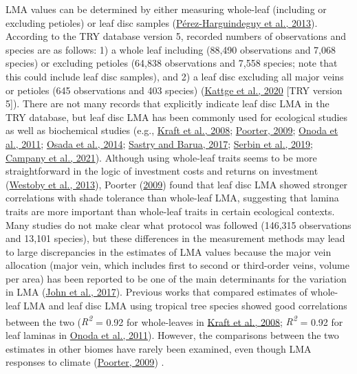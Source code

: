 \documentclass[
  12pt,
  a4paper,
,tablecaptionabove
]{scrartcl}
\begin{document}
LMA values can be determined by either measuring whole-leaf (including or excluding petioles) or leaf disc samples (\protect\hyperlink{ref-Perez-Harguindeguy2013}{Pérez-Harguindeguy et al., 2013}).
According to the TRY database version 5, recorded numbers of observations and species are as follows:
1) a whole leaf including (88,490 observations and 7,068 species) or excluding petioles (64,838 observations and 7,558 species; note that this could include leaf disc samples), and
2) a leaf disc excluding all major veins or petioles (645 observations and 403 species) (\protect\hyperlink{ref-Kattge2020}{Kattge et al., 2020} {[}TRY version 5{]}).
There are not many records that explicitly indicate leaf disc LMA in the TRY database, but leaf disc LMA has been commonly used for ecological studies as well as biochemical studies (e.g., \protect\hyperlink{ref-Kraft2008}{Kraft et al., 2008}; \protect\hyperlink{ref-Poorter2009a}{Poorter, 2009}; \protect\hyperlink{ref-Onoda2011}{Onoda et al., 2011}; \protect\hyperlink{ref-Osada2014}{Osada et al., 2014}; \protect\hyperlink{ref-Sastry2017}{Sastry and Barua, 2017}; \protect\hyperlink{ref-Serbin2019}{Serbin et al., 2019}; \protect\hyperlink{ref-Campany2021}{Campany et al., 2021}).
Although using whole-leaf traits seems to be more straightforward in the logic of investment costs and returns on investment (\protect\hyperlink{ref-Westoby2013}{Westoby et al., 2013}), Poorter (\protect\hyperlink{ref-Poorter2009a}{2009}) found that leaf disc LMA showed stronger correlations with shade tolerance than whole-leaf LMA, suggesting that lamina traits are more important than whole-leaf traits in certain ecological contexts.
Many studies do not make clear what protocol was followed (146,315 observations and 13,101 species), but these differences in the measurement methods may lead to large discrepancies in the estimates of LMA values because the major vein allocation (major vein, which includes first to second or third-order veins, volume per area) has been reported to be one of the main determinants for the variation in LMA (\protect\hyperlink{ref-John2017}{John et al., 2017}).
Previous works that compared estimates of whole-leaf LMA and leaf disc LMA using tropical tree species showed good correlations between the two (\emph{R\textsuperscript{2}} = 0.92 for whole-leaves in \protect\hyperlink{ref-Kraft2008}{Kraft et al., 2008}; \emph{R\textsuperscript{2}} = 0.92 for leaf laminas in \protect\hyperlink{ref-Onoda2011}{Onoda et al., 2011}).
However, the comparisons between the two estimates in other biomes have rarely been examined, even though LMA responses to climate (\protect\hyperlink{ref-Poorter2009a}{Poorter, 2009}) .
\end{document}
